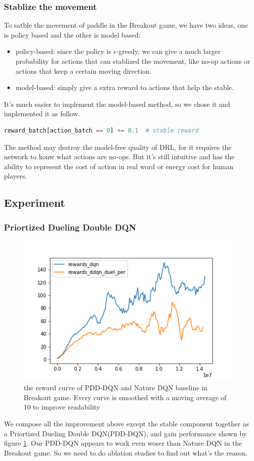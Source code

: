 \documentclass[a4paper, 11pt]{article}
\begin{document}
\subsubsection{Stablize the movement}
To satble the movement of paddle in the Breakout game, we have two ideas, one is policy based and the other is model based:
\begin{itemize}
      \item policy-based: since the policy is $\epsilon$-greedy, we can give a much larger probability for actions that can stablized the movement, like no-op actions or actions that keep a certain moving direction.
      \item model-based: simply give a extra reward to actions that help the stable.
\end{itemize}
It's much easier to implement the model-based method, so we chose it and implemented it as follow.
\begin{lstlisting}[language={python}]
reward_batch[action_batch == 0] += 0.1  # stable reward
	\end{lstlisting}
The method may destroy the model-free quality of DRL, for it requires the network to konw what actions are no-ops. But it's still intuitive and has the ability to represent the cost of action in real word or energy cost for human players.
\subsection{Experiment}
\subsubsection{Priortized Dueling Double DQN}
\begin{figure}[htbp]
      \centering
      \includegraphics[width = 0.6 \textwidth]{01}
      \caption{the reward curve of PDD-DQN and Nature DQN baseline in Breakout game. Every curve is smoothed with a moving
            average of 10 to improve readability}\label{res1}
\end{figure}
We compose all the improvement above except the stable component together as a Priortized Dueling Double DQN(PDD-DQN), and gain performance shown by figure \ref{res1}. Our PDD-DQN appears to work even woser than Nature DQN in the Breakout game. So we need to do ablation studies to find out what's the reason.
\end{document}
